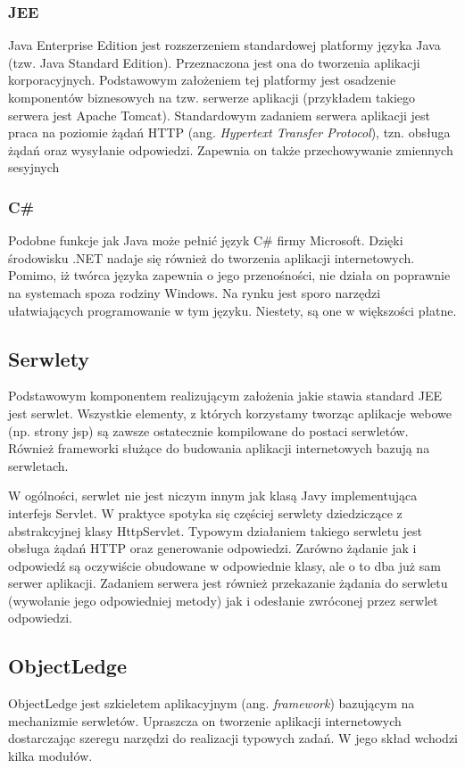 \subsubsection{JEE}
Java Enterprise Edition jest rozszerzeniem standardowej platformy języka Java (tzw. Java Standard Edition). Przeznaczona jest ona do tworzenia aplikacji korporacyjnych. Podstawowym założeniem tej platformy jest osadzenie komponentów biznesowych na tzw. serwerze aplikacji (przykładem takiego serwera jest Apache Tomcat). Standardowym zadaniem serwera aplikacji jest praca na poziomie żądań HTTP (ang. \textit{Hypertext Transfer Protocol}), tzn. obsługa żądań oraz wysyłanie odpowiedzi. Zapewnia on także przechowywanie zmiennych sesyjnych 

\subsubsection{C\#}
Podobne funkcje jak Java może pełnić język C\# firmy Microsoft. Dzięki środowisku .NET nadaje się również do tworzenia aplikacji internetowych. Pomimo, iż twórca języka zapewnia o jego przenośności, nie działa on poprawnie na systemach spoza rodziny Windows. Na rynku jest sporo narzędzi ułatwiających programowanie w tym języku. Niestety, są one w większości płatne.

\subsection[Serwlety][Serwlety]{Serwlety}
Podstawowym komponentem realizującym założenia jakie stawia standard JEE jest serwlet. Wszystkie elementy, z których korzystamy tworząc aplikacje webowe (np. strony jsp) są zawsze ostatecznie kompilowane do postaci serwletów. Również frameworki służące do budowania aplikacji internetowych bazują na serwletach.

W ogólności, serwlet nie jest niczym innym jak klasą Javy implementująca interfejs Servlet. W praktyce spotyka się częściej serwlety dziedziczące z abstrakcyjnej klasy HttpServlet. Typowym działaniem takiego serwletu jest obsługa żądań HTTP oraz generowanie odpowiedzi. Zarówno żądanie jak i odpowiedź są oczywiście obudowane w odpowiednie klasy, ale o to dba już sam serwer aplikacji. Zadaniem serwera jest również przekazanie żądania do serwletu (wywołanie jego odpowiedniej metody) jak i odesłanie zwróconej przez serwlet odpowiedzi.

\subsection[ObjectLedge][ObjectLedge]{ObjectLedge}
ObjectLedge jest szkieletem aplikacyjnym (ang. \textit{framework}) bazującym na mechanizmie serwletów. Upraszcza on tworzenie aplikacji internetowych dostarczając szeregu narzędzi do realizacji typowych zadań. W jego skład wchodzi kilka modułów.

